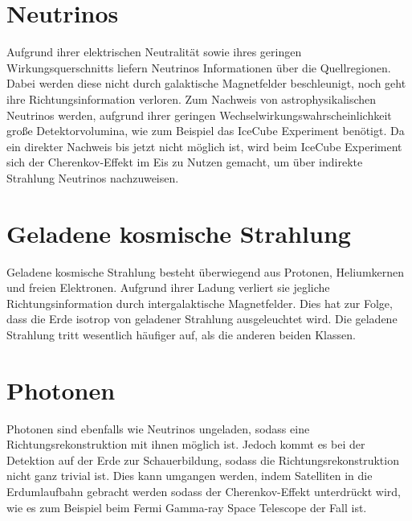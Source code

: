 \section{Neutrinos}
Aufgrund ihrer elektrischen Neutralität sowie ihres geringen Wirkungsquerschnitts liefern Neutrinos Informationen über die Quellregionen. 
Dabei werden diese nicht durch galaktische Magnetfelder beschleunigt, noch geht ihre Richtungsinformation verloren. 
Zum Nachweis von astrophysikalischen Neutrinos werden, aufgrund ihrer geringen Wechselwirkungswahrscheinlichkeit große Detektorvolumina, wie zum Beispiel das IceCube Experiment benötigt.
Da ein direkter Nachweis bis jetzt nicht möglich ist, wird beim IceCube Experiment sich der Cherenkov-Effekt im Eis zu Nutzen gemacht, um über indirekte Strahlung Neutrinos nachzuweisen.


\section{Geladene kosmische Strahlung}
Geladene kosmische Strahlung besteht überwiegend aus Protonen, Heliumkernen und freien Elektronen. 
Aufgrund ihrer Ladung verliert sie jegliche Richtungsinformation durch intergalaktische Magnetfelder. 
Dies hat zur Folge, dass die Erde isotrop von geladener Strahlung ausgeleuchtet wird.
Die geladene Strahlung tritt wesentlich häufiger auf, als die anderen beiden Klassen. 

\section{Photonen}
Photonen sind ebenfalls wie Neutrinos ungeladen, sodass eine Richtungsrekonstruktion mit ihnen möglich ist. 
Jedoch kommt es bei der Detektion auf der Erde zur Schauerbildung, sodass die Richtungsrekonstruktion nicht ganz trivial ist. 
Dies kann umgangen werden, indem Satelliten in die Erdumlaufbahn gebracht werden sodass der Cherenkov-Effekt unterdrückt wird, wie es zum Beispiel beim Fermi Gamma-ray Space Telescope der Fall ist.

